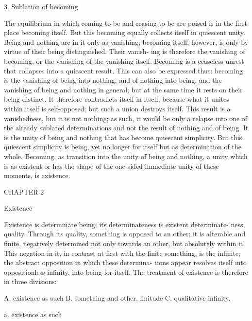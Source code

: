 3. Sublation of becoming

The equilibrium in which coming-to-be and ceasing-to-be are poised is in
the first place becoming itself. But this becoming equally collects itself in
quiescent unity. Being and nothing are in it only as vanishing; becoming
itself, however, is only by virtue of their being distinguished. Their vanish-
ing is therefore the vanishing of becoming, or the vanishing of the vanishing
itself. Becoming is a ceaseless unrest that collapses into a quiescent result.
This can also be expressed thus: becoming is the vanishing of being
into nothing, and of nothing into being, and the vanishing of being and
nothing in general; but at the same time it rests on their being distinct. It
therefore contradicts itself in itself, because what it unites within itself is
self-opposed; but such a union destroys itself.
This result is a vanishedness, but it is not nothing; as such, it would be
only a relapse into one of the already sublated determinations and not the
result of nothing and of being. It is the unity of being and nothing that has
become quiescent simplicity. But this quiescent simplicity is being, yet no
longer for itself but as determination of the whole.
Becoming, as transition into the unity of being and nothing, a unity
which is as existent or has the shape of the one-sided immediate unity of
these moments, is existence.

CHAPTER 2

Existence

Existence is determinate being; its determinateness is existent determinate-
ness, quality. Through its quality, something is opposed to an other; it is
alterable and finite, negatively determined not only towards an other, but
absolutely within it. This negation in it, in contrast at first with the finite
something, is the infinite; the abstract opposition in which these determina-
tions appear resolves itself into oppositionless infinity, into being-for-itself.
The treatment of existence is therefore in three divisions:

A. existence as such
B. something and other, finitude
C. qualitative infinity.

a. existence as such

